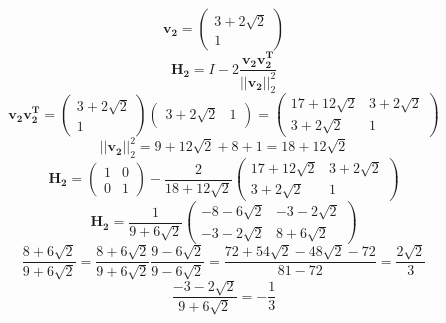 \documentclass{article} %
\begin{document}
\begin{equation}
\boldsymbol{v_2} = \begin{pmatrix} 3 + 2\sqrt{2} \\ 1 \end{pmatrix} 
\end{equation}
\begin{equation}
\boldsymbol{H_2} = I - 2\frac{\boldsymbol{v_2v_2^T}}{||\boldsymbol{v_2}||_2^2}
\end{equation}
\begin{equation}
\boldsymbol{v_2v_2^T} = \begin{pmatrix} 3 + 2\sqrt{2} \\ 1 \end{pmatrix} \begin{pmatrix} 3 + 2\sqrt{2} & 1\end{pmatrix} = \begin{pmatrix} 17 + 12\sqrt{2} & 3 + 2\sqrt{2} \\ 3 + 2\sqrt{2} & 1 \end{pmatrix}
\end{equation}
\begin{equation}
||\boldsymbol{v_2}||_2^2 = 9 + 12\sqrt{2} + 8 + 1 = 18 + 12\sqrt{2}
\end{equation}
\begin{equation}
\boldsymbol{H_2} = \begin{pmatrix} 1 & 0 \\ 0 & 1 \end{pmatrix}  - \frac{2}{18 + 12\sqrt{2}}\begin{pmatrix} 17 + 12\sqrt{2} & 3 + 2\sqrt{2} \\ 3 + 2\sqrt{2} & 1 \end{pmatrix}
\end{equation}
\begin{equation}
\boldsymbol{H_2} = \frac{1}{9 + 6\sqrt{2}}\begin{pmatrix} -8 - 6\sqrt{2} & -3 - 2\sqrt{2} \\ -3 - 2\sqrt{2} & 8 + 6\sqrt{2} \end{pmatrix}
\end{equation}
\begin{equation}
\frac{8 + 6\sqrt{2}}{9 + 6\sqrt{2}} = \frac{8 + 6\sqrt{2}}{9 + 6\sqrt{2}} \frac{9 - 6\sqrt{2}}{9 - 6\sqrt{2}} = \frac{72 +54\sqrt{2} - 48\sqrt{2} - 72}{81 - 72} = \frac{2\sqrt{2}}{3} 
\end{equation}
\begin{equation}
\frac{-3 - 2\sqrt{2}}{9 + 6\sqrt{2}} = -\frac{1}{3}
\end{equation}
\end{document}
